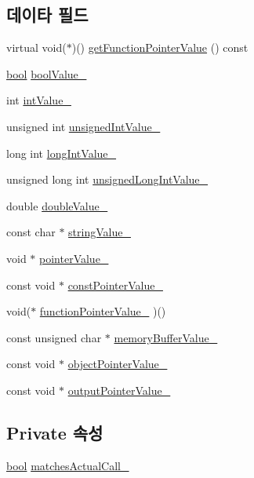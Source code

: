 \subsection*{데이타 필드}
\begin{DoxyCompactItemize}
\item 
virtual void($\ast$)() \hyperlink{class_mock_named_value_abd0a9fd7e8b1d7880c4f8b01ded85657}{get\+Function\+Pointer\+Value} () const
\item 
\hyperlink{avb__gptp_8h_af6a258d8f3ee5206d682d799316314b1}{bool} \hyperlink{class_mock_named_value_a09abee451cc622d483014dedcec24e58}{bool\+Value\+\_\+}
\item 
int \hyperlink{class_mock_named_value_a1da7506365ae1c2052808377b4a26791}{int\+Value\+\_\+}
\item 
unsigned int \hyperlink{class_mock_named_value_ac7bbeb1249238a3f9c83854c5794a19b}{unsigned\+Int\+Value\+\_\+}
\item 
long int \hyperlink{class_mock_named_value_afce071bcbe8335723084f41802df821b}{long\+Int\+Value\+\_\+}
\item 
unsigned long int \hyperlink{class_mock_named_value_ab8e3b434b1b928416e2b0ff65f054869}{unsigned\+Long\+Int\+Value\+\_\+}
\item 
double \hyperlink{class_mock_named_value_ae4bad993fe1e1b4c4b3225670868efa5}{double\+Value\+\_\+}
\item 
const char $\ast$ \hyperlink{class_mock_named_value_a5bc77c3f80ddeee4a5745eb1daec72dc}{string\+Value\+\_\+}
\item 
void $\ast$ \hyperlink{class_mock_named_value_a6832f12cf49d97bb10da35211fa5039a}{pointer\+Value\+\_\+}
\item 
const void $\ast$ \hyperlink{class_mock_named_value_a38076acabeb10cc2757cabdb9365b46e}{const\+Pointer\+Value\+\_\+}
\item 
void($\ast$ \hyperlink{class_mock_named_value_aef42fb6617558520f912651fbfe07c53}{function\+Pointer\+Value\+\_\+} )()
\item 
const unsigned char $\ast$ \hyperlink{class_mock_named_value_acfb46de823cfde8810c5bae34dd454b2}{memory\+Buffer\+Value\+\_\+}
\item 
const void $\ast$ \hyperlink{class_mock_named_value_a436d0ca15a91547fb0b3a39249a42843}{object\+Pointer\+Value\+\_\+}
\item 
const void $\ast$ \hyperlink{class_mock_named_value_aaac935d697b2f0e695e32d2293595450}{output\+Pointer\+Value\+\_\+}
\end{DoxyCompactItemize}
\subsection*{Private 속성}
\begin{DoxyCompactItemize}
\item 
\hyperlink{avb__gptp_8h_af6a258d8f3ee5206d682d799316314b1}{bool} \hyperlink{class_mock_checked_expected_call_1_1_mock_expected_function_parameter_a304a6698e0d1f0e74107be9473ed89a8}{matches\+Actual\+Call\+\_\+}
\end{DoxyCompactItemize}


